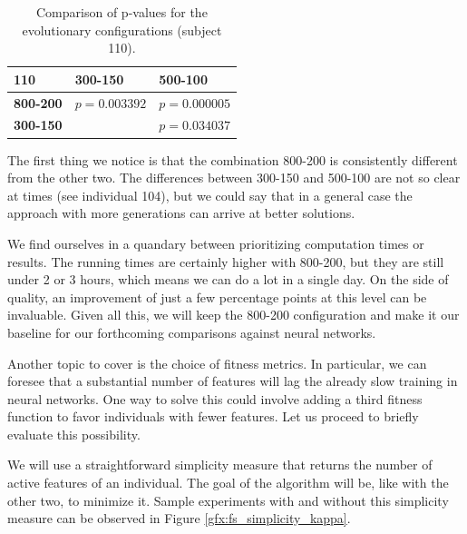     \begin{table}[h]

        \centering
        \setlength\arrayrulewidth{0.8pt}

        \begin{tabular}{| >{\centering\arraybackslash}m{0.9in} |  >{\centering\arraybackslash}m{0.9in} | >{\centering\arraybackslash}m{0.9in} |}

            \hline
            \rowcolor{RoyalBlue}
            \textbf{110} & \textbf{300-150} & \textbf{500-100} \\
            \hline
            \cellcolor{RoyalBlue}\textbf{800-200} & $p = 0.003392$ & $p = 0.000005$ \\
            \hline
            \cellcolor{RoyalBlue}\textbf{300-150} & \cellcolor{lightgray} & $p = 0.034037$ \\
            \hline

        \end{tabular}

        \caption{Comparison of p-values for the evolutionary configurations (subject 110).}\label{table:popgen_kruskal_110}

    \end{table}

    The first thing we notice is that the combination 800-200 is consistently different from the other two. The differences between 300-150 and 500-100 are not so clear at times (see individual 104), but we could say that in a general case the approach with more generations can arrive at better solutions.

    We find ourselves in a quandary between prioritizing computation times or results. The running times are certainly higher with 800-200, but they are still under 2 or 3 hours, which means we can do a lot in a single day. On the side of quality, an improvement of just a few percentage points at this level can be invaluable. Given all this, we will keep the 800-200 configuration and make it our baseline for our forthcoming comparisons against neural networks.

    Another topic to cover is the choice of fitness metrics. In particular, we can foresee that a substantial number of features will lag the already slow training in neural networks. One way to solve this could involve adding a third fitness function to favor individuals with fewer features. Let us proceed to briefly evaluate this possibility.

    We will use a straightforward simplicity measure that returns the number of active features of an individual. The goal of the algorithm will be, like with the other two, to minimize it. Sample experiments with and without this simplicity measure can be observed in Figure \ref{gfx:fs_simplicity_kappa}.

